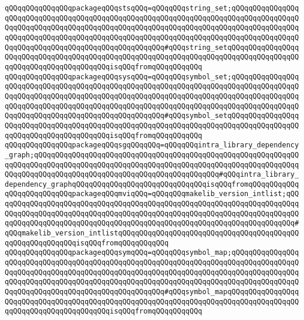 \verb|qQQqqQQqqQQqqQQqpackageqQQqstsqQQq=qQQqqQQqstring_set;qQQqqQQqqQQqqQQqqQQqqQQqqQQqqQQqqQQqqQQqqQQqqQQqqQQqqQQqqQQqqQQqqQQqqQQqqQQqqQQqqQQqqQQqqQQqqQQqqQQqqQQqqQQqqQQqqQQqqQQqqQQqqQQqqQQqqQQqqQQqqQQqqQQqqQQqqQQqqQQqqQQqqQQqqQQqqQQqqQQqqQQqqQQqqQQqqQQqqQQqqQQqqQQqqQQqqQQqqQQqqQQqqQQqqQQqqQQqqQQqqQQqqQQqqQQqqQQqqQQqqQQq#qQQqstring_setqQQqqQQqqQQqqQQqqQQqqQQqqQQqqQQqqQQqqQQqqQQqqQQqqQQqqQQqqQQqqQQqqQQqqQQqqQQqqQQqqQQqqQQqqQQqqQQqqQQqqQQqqQQqqQQqisqQQqfromqQQqqQQqqQQq|\newline
\verb|qQQqqQQqqQQqqQQqpackageqQQqsysqQQq=qQQqqQQqsymbol_set;qQQqqQQqqQQqqQQqqQQqqQQqqQQqqQQqqQQqqQQqqQQqqQQqqQQqqQQqqQQqqQQqqQQqqQQqqQQqqQQqqQQqqQQqqQQqqQQqqQQqqQQqqQQqqQQqqQQqqQQqqQQqqQQqqQQqqQQqqQQqqQQqqQQqqQQqqQQqqQQqqQQqqQQqqQQqqQQqqQQqqQQqqQQqqQQqqQQqqQQqqQQqqQQqqQQqqQQqqQQqqQQqqQQqqQQqqQQqqQQqqQQqqQQqqQQqqQQqqQQqqQQq#qQQqsymbol_setqQQqqQQqqQQqqQQqqQQqqQQqqQQqqQQqqQQqqQQqqQQqqQQqqQQqqQQqqQQqqQQqqQQqqQQqqQQqqQQqqQQqqQQqqQQqqQQqqQQqqQQqqQQqqQQqisqQQqfromqQQqqQQqqQQq|\newline
\verb|qQQqqQQqqQQqqQQqpackageqQQqsgqQQqqQQq=qQQqqQQqintra_library_dependency_graph;qQQqqQQqqQQqqQQqqQQqqQQqqQQqqQQqqQQqqQQqqQQqqQQqqQQqqQQqqQQqqQQqqQQqqQQqqQQqqQQqqQQqqQQqqQQqqQQqqQQqqQQqqQQqqQQqqQQqqQQqqQQqqQQqqQQqqQQqqQQqqQQqqQQqqQQqqQQqqQQqqQQqqQQqqQQqqQQqqQQqqQQq#qQQqintra_library_dependency_graphqQQqqQQqqQQqqQQqqQQqqQQqqQQqqQQqisqQQqfromqQQqqQQqqQQq|\newline
\verb|qQQqqQQqqQQqqQQqpackageqQQqmviqQQq=qQQqqQQqmakelib_version_intlist;qQQqqQQqqQQqqQQqqQQqqQQqqQQqqQQqqQQqqQQqqQQqqQQqqQQqqQQqqQQqqQQqqQQqqQQqqQQqqQQqqQQqqQQqqQQqqQQqqQQqqQQqqQQqqQQqqQQqqQQqqQQqqQQqqQQqqQQqqQQqqQQqqQQqqQQqqQQqqQQqqQQqqQQqqQQqqQQqqQQqqQQqqQQqqQQqqQQqqQQqqQQqqQQqqQQq#qQQqmakelib_version_intlistqQQqqQQqqQQqqQQqqQQqqQQqqQQqqQQqqQQqqQQqqQQqqQQqqQQqqQQqqQQqisqQQqfromqQQqqQQqqQQq|\newline
\verb|qQQqqQQqqQQqqQQqpackageqQQqsymqQQq=qQQqqQQqsymbol_map;qQQqqQQqqQQqqQQqqQQqqQQqqQQqqQQqqQQqqQQqqQQqqQQqqQQqqQQqqQQqqQQqqQQqqQQqqQQqqQQqqQQqqQQqqQQqqQQqqQQqqQQqqQQqqQQqqQQqqQQqqQQqqQQqqQQqqQQqqQQqqQQqqQQqqQQqqQQqqQQqqQQqqQQqqQQqqQQqqQQqqQQqqQQqqQQqqQQqqQQqqQQqqQQqqQQqqQQqqQQqqQQqqQQqqQQqqQQqqQQqqQQqqQQqqQQqqQQqqQQqqQQq#qQQqsymbol_mapqQQqqQQqqQQqqQQqqQQqqQQqqQQqqQQqqQQqqQQqqQQqqQQqqQQqqQQqqQQqqQQqqQQqqQQqqQQqqQQqqQQqqQQqqQQqqQQqqQQqqQQqqQQqqQQqisqQQqfromqQQqqQQqqQQq|\newline
